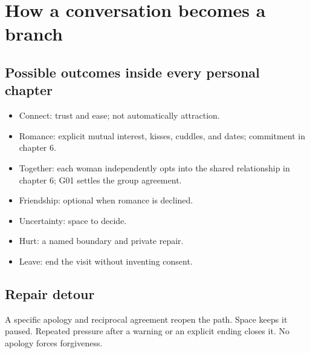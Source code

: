 \documentclass[11pt]{article}
\begin{document}
\section*{How a conversation becomes a branch}
\begin{center}\end{center}
\subsection*{Possible outcomes inside every personal chapter}
\begin{itemize}\item Connect: trust and ease; not automatically attraction.\item Romance: explicit mutual interest, kisses, cuddles, and dates; commitment in chapter 6.\item Together: each woman independently opts into the shared relationship in chapter 6; G01 settles the group agreement.\item Friendship: optional when romance is declined.\item Uncertainty: space to decide.\item Hurt: a named boundary and private repair.\item Leave: end the visit without inventing consent.\end{itemize}
\subsection*{Repair detour}
A specific apology and reciprocal agreement reopen the path. Space keeps it paused. Repeated pressure after a warning or an explicit ending closes it. No apology forces forgiveness.
\end{document}
